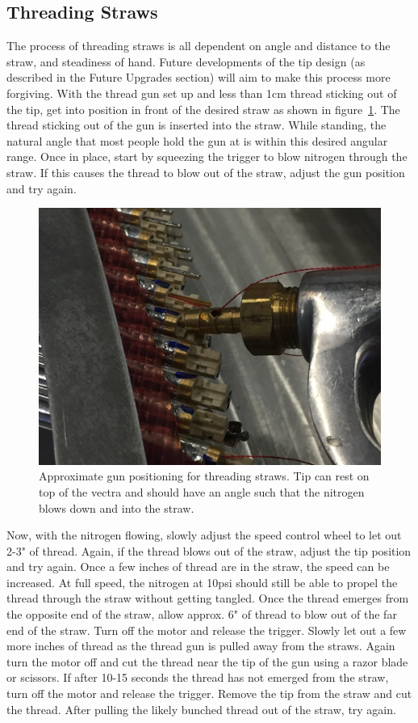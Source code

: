 \documentclass[letterpaper,12pt]{article}
\begin{document}
\subsection{Threading Straws}
The process of threading straws is all dependent on angle and distance to the straw, and steadiness of hand. Future developments of the tip design (as described in the Future Upgrades section) will aim to make this process more forgiving. With the thread gun set up and less than 1cm thread sticking out of the tip, get into position in front of the desired straw as shown in figure~\ref{fig:no_tip}. The thread sticking out of the gun is inserted into the straw. While standing, the natural angle that most people hold the gun at is within this desired angular range. Once in place, start by squeezing the trigger to blow nitrogen through the straw. If this causes the thread to blow out of the straw, adjust the gun position and try again.\par
\begin{figure} [h!]
		\centering
		\includegraphics[width=1\textwidth,angle=0]{no_tip_zoom.JPG}
		\caption{Approximate gun positioning for threading straws. Tip can rest on top of the vectra and should have an angle such that the nitrogen blows down and into the straw.}
		\label{fig:no_tip}
\end{figure}
Now, with the nitrogen flowing, slowly adjust the speed control wheel to let out 2-3" of thread. Again, if the thread blows out of the straw, adjust the tip position and try again. Once a few inches of thread are in the straw, the speed can be increased. At full speed, the nitrogen at 10psi should still be able to propel the thread through the straw without getting tangled. Once the thread emerges from the opposite end of the straw, allow approx. 6" of thread to blow out of the far end of the straw. Turn off the motor and release the trigger. Slowly let out a few more inches of thread as the thread gun is pulled away from the straws. Again turn the motor off and cut the thread near the tip of the gun using a razor blade or scissors. If after 10-15 seconds the thread has not emerged from the straw, turn off the motor and release the trigger. Remove the tip from the straw and cut the thread. After pulling the likely bunched thread out of the straw, try again. 
\end{document}
